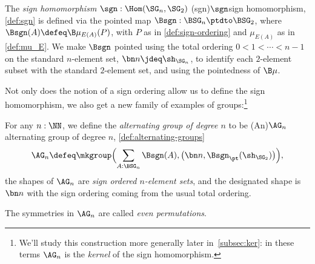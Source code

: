 \begin{definition}\label{def:sgn}
  The \emph{sign homomorphism} $\sgn : \Hom(\SG_n,\SG_2)$%
  \glossary(sgn){$\protect\sgn$}{sign homomorphism, \cref{def:sgn}}
  is defined via the pointed map $\Bsgn : \BSG_n \ptdto \BSG_2$,
  where $\Bsgn(A) \defeq \B\mu_{E(A)}(P)$, with $P$ as in
  \cref{def:sign-ordering} and $\mu_{E(A)}$ as in \cref{def:mu_E}.
  We make $\Bsgn$ pointed using the total ordering 
  $0 < 1 < \cdots < n-1$ on the standard $n$-element set, 
  $\bn n \jdeq \sh_{\SG_n}$, to identify each $2$-element 
  subset with the standard $2$-element set,
  and using the pointedness of $\B\mu$.
\end{definition}
Not only does the notion of a sign ordering allow us to define the
sign homomorphism, we also get a new family of examples of groups:\footnote{%
  We'll study this construction more generally later in~\cref{subsec:ker}:
  in these terms $\AG_n$ is the \emph{kernel} of the sign homomorphism.}
\begin{definition}\label{def:alternating-groups}
  For any $n:\NN$, we define the \emph{alternating group of degree $n$}
  to be%
  \glossary(An){$\protect\AG_n$}{alternating group of degree $n$,
      \cref{def:alternating-groups}}
  \[
    \AG_n \defeq \mkgroup\Bigl(\sum_{A:\BSG_n}\Bsgn(A),
      \bigl(\bn n, \Bsgn_\pt(\sh_{\SG_2})\bigr)\Bigr),
  \]
  \ie the shapes of $\AG_n$ are \emph{sign ordered $n$-element sets},
  and the designated shape is $\bn n$ with the sign ordering coming
  from the usual total ordering.

  The symmetries in $\AG_n$ are called \emph{even permutations}.%
\end{definition}

